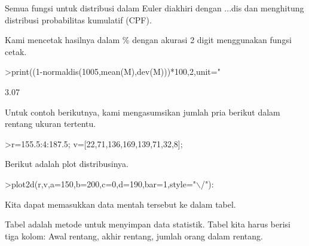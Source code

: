 \documentclass{article}
\begin{document}
\begin{eulernotebook}
\begin{eulercomment}
\begin{eulercomment}
\begin{eulercomment}
\begin{eulercomment}
\begin{eulercomment}
\begin{eulercomment}
\begin{eulercomment}
Semua fungsi untuk distribusi dalam Euler diakhiri dengan ...dis dan
menghitung distribusi probabilitas kumulatif (CPF).

Kami mencetak hasilnya dalam \% dengan akurasi 2 digit menggunakan
fungsi cetak.
\end{eulercomment}
\begin{eulerprompt}
>print((1-normaldis(1005,mean(M),dev(M)))*100,2,unit=" %
\end{eulerprompt}
\begin{euleroutput}
        3.07 %
\end{euleroutput}
\begin{eulercomment}
Untuk contoh berikutnya, kami mengasumsikan jumlah pria berikut dalam
rentang ukuran tertentu.
\end{eulercomment}
\begin{eulerprompt}
>r=155.5:4:187.5; v=[22,71,136,169,139,71,32,8];
\end{eulerprompt}
\begin{eulercomment}
Berikut adalah plot distribusinya.
\end{eulercomment}
\begin{eulerprompt}
>plot2d(r,v,a=150,b=200,c=0,d=190,bar=1,style="\(\backslash\)/"):
\end{eulerprompt}
\begin{eulercomment}
Kita dapat memasukkan data mentah tersebut ke dalam tabel.

Tabel adalah metode untuk menyimpan data statistik. Tabel kita harus
berisi tiga kolom: Awal rentang, akhir rentang, jumlah orang dalam
rentang.


\end{eulercomment}
\end{eulercomment}
\end{eulercomment}
\end{eulercomment}
\end{eulercomment}
\end{eulercomment}
\end{eulercomment}
\end{eulernotebook}
\end{document}
